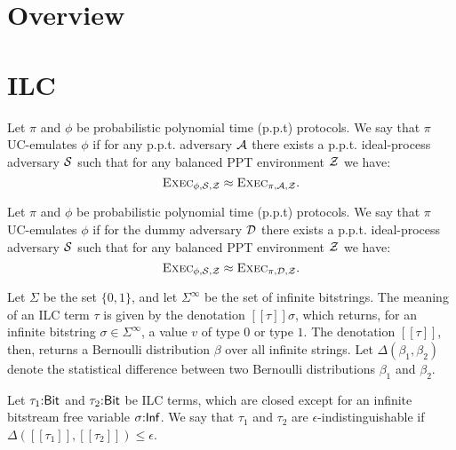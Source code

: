 \documentclass[acmsmall,review,anonymous]{acmart}\settopmatter{printfolios=true,printccs=false,printacmref=false}
\begin{document}
\section{Overview}\label{sec:overview}

\section{ILC}\label{sec:ilc}

\begin{definition}
Let $\pi$ and $\phi$ be probabilistic polynomial time (p.p.t) protocols. We say
that $\pi$ UC-emulates $\phi$ if for any p.p.t. adversary $\mathcal{A}$ there exists a
p.p.t. ideal-process adversary $\mathcal{S}$ such that for any balanced PPT environment
$\mathcal{Z}$ we have:
\begin{equation*}
\textsc{Exec}_{\phi, \mathcal{S}, \mathcal{Z}} \approx \textsc{Exec}_{\pi, \mathcal{A}, \mathcal{Z}}.
\end{equation*}
\end{definition}

\begin{definition}
Let $\pi$ and $\phi$ be probabilistic polynomial time (p.p.t) protocols. We say
that $\pi$ UC-emulates $\phi$ if for the dummy adversary $\mathcal{D}$ there exists a
p.p.t. ideal-process adversary $\mathcal{S}$ such that for any balanced PPT environment
$\mathcal{Z}$ we have:
\begin{equation*}
\textsc{Exec}_{\phi, \mathcal{S}, \mathcal{Z}} \approx \textsc{Exec}_{\pi, \mathcal{D}, \mathcal{Z}}.
\end{equation*}
\end{definition}

Let $\Sigma$ be the set $\{ 0, 1\}$, and let $\Sigma^{\infty}$ be the set of infinite
bitstrings. The meaning of an ILC term $\tau$ is given by the denotation
$[\![\tau]\!]\sigma$, which returns, for an infinite bitstring $\sigma \in \Sigma^{\infty}$, a value $v$
of type $0$ or type $1$. The denotation $[\![\tau]\!]$, then, returns a Bernoulli
distribution $\beta$ over all infinite strings. Let $\Delta(\beta_1, \beta_2)$ denote the
statistical difference between two Bernoulli distributions $\beta_1$ and $\beta_2$.

\begin{definition}
Let $\tau_1{:}{\sf Bit}$ and $\tau_2{:}{\sf Bit}$ be ILC terms, which are closed
except for an infinite bitstream free variable $\sigma{:}{\sf Inf}$. We say that
$\tau_1$ and $\tau_2$ are $\epsilon$-indistinguishable if $\Delta([\![\tau_1]\!], [\![\tau_2]\!]) \leq \epsilon$.
\end{definition}
\end{document}
